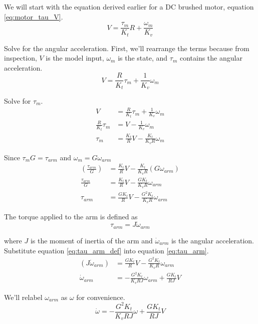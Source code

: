 We will start with the equation derived earlier for a DC brushed motor, equation
\eqref{eq:motor_tau_V}.
\begin{equation*}
  V = \frac{\tau_m}{K_t} R + \frac{\omega_m}{K_v}
\end{equation*}

Solve for the angular acceleration. First, we'll rearrange the terms because
from inspection, $V$ is the \gls{model} \gls{input}, $\omega_m$ is the
\gls{state}, and $\tau_m$ contains the angular acceleration.
\begin{equation*}
  V = \frac{R}{K_t} \tau_m + \frac{1}{K_v} \omega_m
\end{equation*}

Solve for $\tau_m$.
\begin{align*}
  V &= \frac{R}{K_t} \tau_m + \frac{1}{K_v} \omega_m \\
  \frac{R}{K_t} \tau_m &= V - \frac{1}{K_v} \omega_m \\
  \tau_m &= \frac{K_t}{R} V - \frac{K_t}{K_v R} \omega_m
\end{align*}

Since $\tau_m G = \tau_{arm}$ and $\omega_m = G \omega_{arm}$
\begin{align}
  \left(\frac{\tau_{arm}}{G}\right) &= \frac{K_t}{R} V -
    \frac{K_t}{K_v R} (G \omega_{arm}) \nonumber \\
  \frac{\tau_{arm}}{G} &= \frac{K_t}{R} V - \frac{G K_t}{K_v R} \omega_{arm}
    \nonumber \\
  \tau_{arm} &= \frac{G K_t}{R} V - \frac{G^2 K_t}{K_v R} \omega_{arm}
    \label{eq:tau_arm}
\end{align}

The torque applied to the arm is defined as
\begin{equation}
  \tau_{arm} = J \dot{\omega}_{arm} \label{eq:tau_arm_def}
\end{equation}

where $J$ is the moment of inertia of the arm and $\dot{\omega}_{arm}$ is the
angular acceleration. Substitute equation \eqref{eq:tau_arm_def} into equation
\eqref{eq:tau_arm}.
\begin{align*}
  (J \dot{\omega}_{arm}) &= \frac{G K_t}{R} V - \frac{G^2 K_t}{K_v R}
    \omega_{arm} \nonumber \\
  \dot{\omega}_{arm} &= -\frac{G^2 K_t}{K_v RJ} \omega_{arm} +
    \frac{G K_t}{RJ} V
\end{align*}

We'll relabel $\omega_{arm}$ as $\omega$ for convenience.
\begin{equation}
  \dot{\omega} = -\frac{G^2 K_t}{K_v RJ} \omega + \frac{G K_t}{RJ} V
    \label{eq:dot_omega_arm}
\end{equation}

